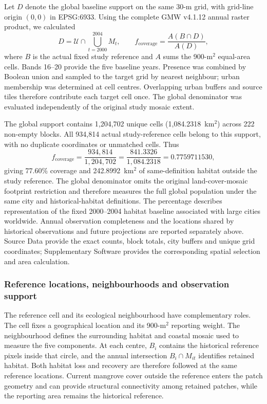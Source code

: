 Let $D$ denote the global baseline support on the same 30-m grid, with grid-line origin $(0,0)$ in EPSG:6933. Using the complete GMW v4.1.12 annual raster product, we calculated
\[
D=\mathcal U\cap\bigcup_{t=2000}^{2004}M_t,
\qquad
f_{\mathrm{coverage}}=\frac{A(B\cap D)}{A(D)},
\]
where $B$ is the actual fixed study reference and $A$ sums the 900-m$^2$ equal-area cells. Bands 16--20 provide the five baseline years. Presence was combined by Boolean union and sampled to the target grid by nearest neighbour; urban membership was determined at cell centres. Overlapping urban buffers and source tiles therefore contribute each target cell once. The global denominator was evaluated independently of the original study mosaic extent.

The global support contains 1,204,702 unique cells (1,084.2318~km$^2$) across 222 non-empty blocks. All 934,814 actual study-reference cells belong to this support, with no duplicate coordinates or unmatched cells. Thus
\[
f_{\mathrm{coverage}}
=\frac{934{,}814}{1{,}204{,}702}
=\frac{841.3326}{1{,}084.2318}
=0.7759711530,
\]
giving 77.60\% coverage and 242.8992~km$^2$ of same-definition habitat outside the study reference. The global denominator omits the original land-cover-mosaic footprint restriction and therefore measures the full global population under the same city and historical-habitat definitions. The percentage describes representation of the fixed 2000--2004 habitat baseline associated with large cities worldwide. Annual observation completeness and the locations shared by historical observations and future projections are reported separately above. Source Data provide the exact counts, block totals, city buffers and unique grid coordinates; Supplementary Software provides the corresponding spatial selection and area calculation. 

\subsubsection{Reference locations, neighbourhoods and observation support}
The reference cell and its ecological neighbourhood have complementary roles. The cell fixes a geographical location and its 900-m$^2$ reporting weight. The neighbourhood defines the surrounding habitat and coastal mosaic used to measure the five components. At each centre, $B_i$ contains the historical reference pixels inside that circle, and the annual intersection $B_i\cap M_{it}$ identifies retained habitat. Both habitat loss and recovery are therefore followed at the same reference locations. Current mangrove cover outside the reference enters the patch geometry and can provide structural connectivity among retained patches, while the reporting area remains the historical reference.

